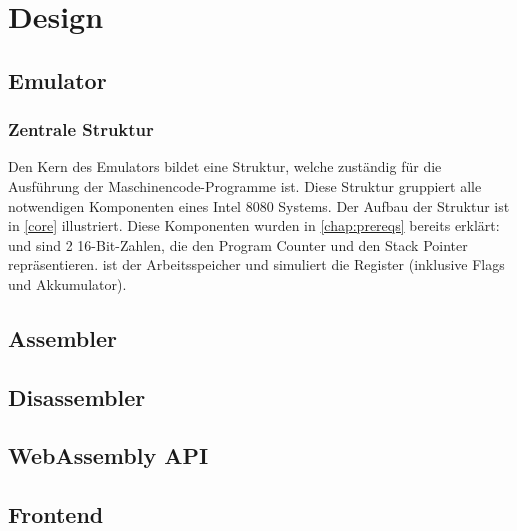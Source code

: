 \chapter{Design}\label{chap:design}

\section{Emulator}

\subsection{Zentrale Struktur}

Den Kern des Emulators bildet eine Struktur, welche zuständig für die Ausführung der Maschinencode-Programme ist. Diese Struktur gruppiert alle notwendigen Komponenten eines Intel 8080 Systems. Der Aufbau der Struktur ist in \cref{core} illustriert.
Diese Komponenten wurden in \cref{chap:prereqs} bereits erklärt:  und  sind 2 16-Bit-Zahlen, die den Program Counter und den Stack Pointer repräsentieren.  ist der Arbeitsspeicher und  simuliert die Register (inklusive Flags und Akkumulator).


\section{Assembler}

\section{Disassembler}

\section{WebAssembly API}

\section{Frontend}
